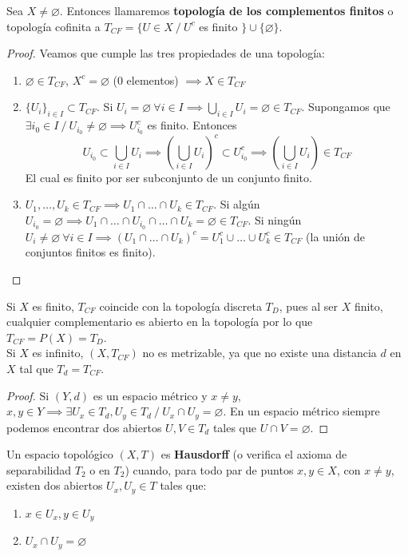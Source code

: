 \begin{exmp}
  Sea $X \neq \varnothing $. Entonces llamaremos \textbf{topología de los complementos finitos} o topología cofinita a $T_{CF}=\{U \in X\ /\ U^c$ es finito $\} \cup \{\varnothing \}$.
\end{exmp}
\begin{proof}
  Veamos que cumple las tres propiedades de una topología:
  \begin{enumerate}
    \item $\varnothing \in T_{CF}$, $X^c = \varnothing $ (0 elementos) $\implies X \in T_{CF}$
    \item $\{U_i\}_{i \in I} \subset T_{CF}$. Si $U_i = \varnothing \ \forall i \in I \implies \bigcup_{i \in I} U_i = \varnothing \in T_{CF}$. Supongamos que $\exists i_0 \in I\ /\ U_{i_0} \neq \varnothing \implies U^c_{i_0}$ es finito. Entonces \[U_{i_0} \subset \bigcup_{i \in I} U_i \implies \left(\bigcup_{i \in I} U_i \right )^c \subset U_{i_0}^c \implies \left( \bigcup_{i \in I} U_i \right) \in T_{CF} \] El cual es finito por ser subconjunto de un conjunto finito.
    \item $U_1,\ldots,U_k \in T_{CF} \implies U_1 \cap\ldots\cap U_k \in T_{CF}$. Si algún $U_{i_0} = \varnothing \implies U_1 \cap \ldots \cap U_{i_0} \cap \ldots \cap U_k = \varnothing \in T_{CF}$. Si ningún $U_i \neq \varnothing \ \forall i \in I \implies (U_1 \cap \ldots \cap U_k)^c = U_1^c \cup \ldots \cup U_k^c \in  T_{CF}$ (la unión de conjuntos finitos es finito).
  \end{enumerate}
\end{proof}

Si $X$ es finito, $T_{CF}$ coincide con la topología discreta $T_D$, pues al ser $X$ finito, cualquier complementario es abierto en la topología por lo que $T_{CF} = P(X) = T_D$. \\

Si $X$ es infinito, $(X,T_{CF})$ no es metrizable, ya que no existe una distancia $d$ en $X$ tal que $T_d=T_{CF}$.
\begin{proof}
  Si $(Y,d)$ es un espacio métrico y $x \neq y$, $x,y \in Y \implies \exists U_x \in T_d, U_y \in T_d\ /\ U_x \cap U_y = \varnothing $. En un espacio métrico siempre podemos encontrar dos abiertos $U,V \in T_d$ tales que $U \cap V = \varnothing $.
\end{proof}

\begin{ndef}
  Un espacio topológico $(X,T)$ es \textbf{Hausdorff} (o verifica el axioma de separabilidad $T_2$ o en $T_2$) cuando, para todo par de puntos $x,y \in X$, con $x \neq y$, existen dos abiertos $U_x,U_y \in T$ tales que:
  \begin{enumerate}
    \item $x \in U_x, y \in U_y$
    \item $U_x \cap U_y = \varnothing $
  \end{enumerate}
\end{ndef}

